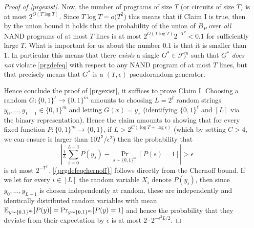 \begin{proof}[Proof of \cref{prgexist}]
Now, the number of programs of size \(T\) (or circuits of size \(T\)) is
at most \(2^{O(T\log T)}\). Since \(T\log T = o(T^2\)) this means that
if Claim I is true, then by the union bound it holds that the
probability of the union of \(B_P\) over \emph{all} NAND programs of at
most \(T\) lines is at most \(2^{O(T\log T)}2^{-T^2} < 0.1\) for
sufficiently large \(T\). What is important for us about the number
\(0.1\) is that it is smaller than \(1\). In particular this means that
there \emph{exists} a single \(G^* \in \mathcal{F}_\ell^m\) such that
\(G^*\) \emph{does not} violate \eqref{prgdefeq} with respect to any
NAND program of at most \(T\) lines, but that precisely means that
\(G^*\) is a \((T,\epsilon)\) pseudorandom generator.

Hence conclude the proof of \cref{prgexist}, it suffices to prove Claim
I. Choosing a random \(G: \{0,1\}^\ell \rightarrow \{0,1\}^m\) amounts
to choosing \(L=2^\ell\) random strings
\(y_0,\ldots,y_{L-1} \in \{0,1\}^m\) and letting \(G(x)=y_x\)
(identifying \(\{0,1\}^\ell\) and \([L]\) via the binary
representation). Hence the claim amounts to showing that for every fixed
function \(P:\{0,1\}^m \rightarrow \{0,1\}\), if
\(L > 2^{C (\log T + \log \epsilon)}\) (which by setting \(C>4\), we can
ensure is larger than \(10 T^2/\epsilon^2\)) then the probability that
\[
\left| \tfrac{1}{L}\sum_{i=0}^{L-1} P(y_s)  -  \Pr_{s \sim \{0,1\}^m}[P(s)=1] \right| > \epsilon \label{prgdefeqchernoff}
\] is at most \(2^{-T^2}\). \eqref{{prgdefeqchernoff}} follows directly
from the Chernoff bound. If we let for every \(i\in [L]\) the random
variable \(X_i\) denote \(P(y_i)\), then since \(y_0,\ldots,y_{L-1}\) is
chosen independently at random, these are independently and identically
distributed random variables with mean
\(\operatorname*{\mathbb E}_{y \sim \{0,1\}^m}[P(y)]= \Pr_{y\sim \{0,1\}^m}[ P(y)=1]\) and
hence the probability that they deviate from their expectation by
\(\epsilon\) is at most \(2\cdot 2^{-\epsilon^2 L/2}\).

\end{proof}
